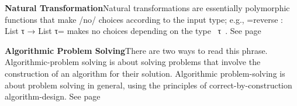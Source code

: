 \documentclass[11pt]{article}
\begin{document}
\vspace{1em}\textbf{Natural Transformation}\quad\label{org-special-block-extras-glossary-nat-trans}Natural transformations are essentially polymorphic functions that make /no/  choices according to the input type; e.g., =reverse : List τ → List τ= makes no  choices depending on the type ~τ~. See page \pageref{org-special-block-extras-glossary-declaration-site-nat-trans}

\vspace{1em}\textbf{Algorithmic Problem Solving}\quad\label{org-special-block-extras-glossary-Algorithmic_Problem_Solving}There are two ways to read this phrase.   Algorithmic-problem solving is about solving problems that  involve the construction of an algorithm for their solution.   Algorithmic problem-solving is about problem solving in general,  using the principles of correct-by-construction algorithm-design. See page \pageref{org-special-block-extras-glossary-declaration-site-Algorithmic_Problem_Solving}
\end{document}
